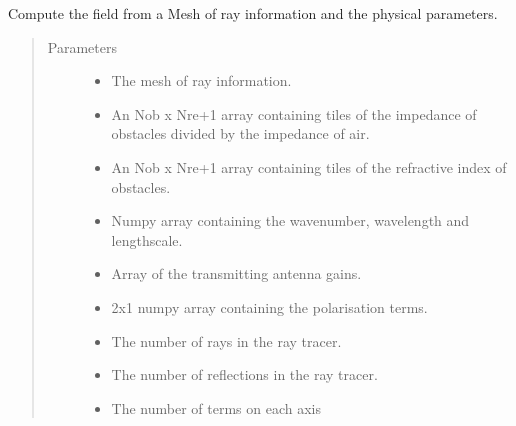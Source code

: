 \documentclass[letterpaper,10pt,english]{sphinxmanual}
\begin{document}
\begin{fulllineitems}
\label{\detokenize{index:DictionarySparseMatrix.power_compute}}
Compute the field from a Mesh of ray information and the physical   parameters.
\begin{quote}\begin{description}
\item[{Parameters}] \leavevmode\begin{itemize}
\item {} 
 \textendash{} The {\hyperref[\detokenize{index:DictionarySparseMatrix.DS}]{}} mesh of ray information.

\item {} 
 \textendash{} An Nob x Nre+1 array containing tiles of the impedance   of obstacles divided by the impedance of air.

\item {} 
 \textendash{} An Nob x Nre+1 array containing tiles of the refractive  index of obstacles.

\item {} 
 \textendash{} Numpy array containing the wavenumber, wavelength and lengthscale.

\item {} 
 \textendash{} Array of the transmitting antenna gains.

\item {} 
 \textendash{} 2x1 numpy array containing the polarisation terms.

\item {} 
 \textendash{} The number of rays in the ray tracer.

\item {} 
 \textendash{} The number of reflections in the ray tracer.

\item {} 
 \textendash{} The number of terms on each axis


\end{itemize}
\end{description}
\end{quote}
\end{fulllineitems}
\end{document}
